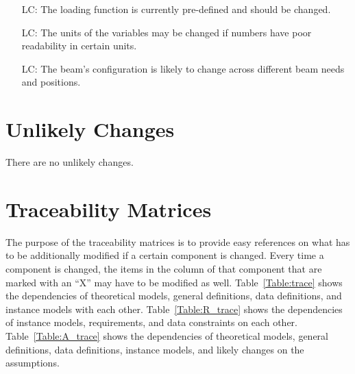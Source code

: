 \documentclass[12pt]{article}
\newcounter{lcnum} %
\begin{document}
\noindent\begin{itemize}

    \item[LC\refstepcounter{lcnum}\thelcnum\label{LC_loading}:] The loading
        function is currently pre-defined and should be changed.

    \item[LC\refstepcounter{lcnum}\thelcnum\label{LC_units}:] The units of the
        variables may be changed if numbers have poor readability in certain
        units.

    \item[LC\refstepcounter{lcnum}\thelcnum\label{LC_beam_configuration}:] The
        beam's configuration is likely to change across different beam needs and
        positions.

\end{itemize}


\section{Unlikely Changes}

There are no unlikely changes.


\section{Traceability Matrices}

The purpose of the traceability matrices is to provide easy references on what
has to be additionally modified if a certain component is changed.  Every time a
component is changed, the items in the column of that component that are marked
with an ``X'' may have to be modified as well.  Table~\ref{Table:trace} shows
the dependencies of theoretical models, general definitions, data definitions,
and instance models with each other. Table~\ref{Table:R_trace} shows the
dependencies of instance models, requirements, and data constraints on each
other. Table~\ref{Table:A_trace} shows the dependencies of theoretical models,
general definitions, data definitions, instance models, and likely changes on
the assumptions.
\end{document}
